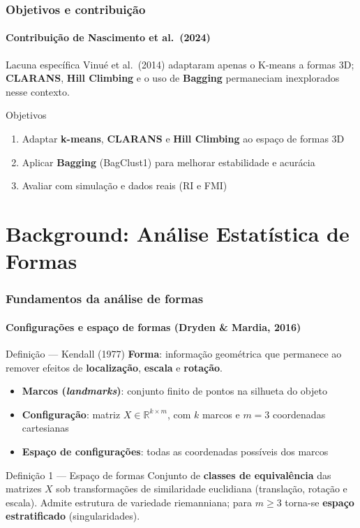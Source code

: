 \documentclass[brazilian,11pt]{beamer}
\begin{document}
\begin{frame}[t]
    \frametitle{Objetivos e contribuição}
    \framesubtitle{Contribuição de Nascimento et al.\ (2024)}

    \vspace{-0.1cm}
    \begin{block}{Lacuna específica}
        \footnotesize
        Vinué et al.\ (2014) adaptaram apenas o K-means a formas 3D; \textbf{CLARANS}, \textbf{Hill Climbing} e o uso de \textbf{Bagging} permaneciam inexplorados nesse contexto.
    \end{block}
    \vspace{0.15em}
    \begin{block}{Objetivos}
        \footnotesize
        \begin{enumerate}
            \item Adaptar \textbf{k-means}, \textbf{CLARANS} e \textbf{Hill Climbing} ao espaço de formas 3D
            \item Aplicar \textbf{Bagging} (BagClust1) para melhorar estabilidade e acurácia
            \item Avaliar com simulação e dados reais (RI e FMI)
        \end{enumerate}
    \end{block}
\end{frame}

\section[Formas]{Background: Análise Estatística de Formas}

\begin{frame}[shrink=8]
    \frametitle{Fundamentos da análise de formas}
    \framesubtitle{Configurações e espaço de formas (Dryden \& Mardia, 2016)}

    \begin{block}{Definição --- Kendall (1977)}
        \textbf{Forma}: informação geométrica que permanece ao remover efeitos de \textbf{localização}, \textbf{escala} e \textbf{rotação}.
    \end{block}

    \begin{itemize}
        \item \textbf{Marcos (\textit{landmarks})}: conjunto finito de pontos na silhueta do objeto
        \item \textbf{Configuração}: matriz $X \in \mathbb{R}^{k \times m}$, com $k$ marcos e $m=3$ coordenadas cartesianas
        \item \textbf{Espaço de configurações}: todas as coordenadas possíveis dos marcos
    \end{itemize}

    \begin{block}{Definição 1 --- Espaço de formas}
        Conjunto de \textbf{classes de equivalência} das matrizes $X$ sob transformações de similaridade euclidiana (translação, rotação e escala). Admite estrutura de variedade riemanniana; para $m \geq 3$ torna-se \textbf{espaço estratificado} (singularidades).
    \end{block}
\end{frame}
\end{document}
